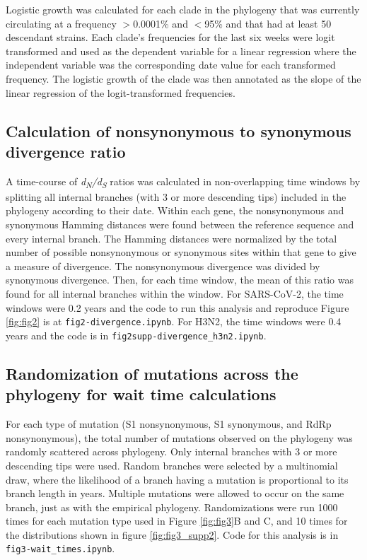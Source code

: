 \documentclass[11pt,oneside,letterpaper]{article}
\begin{document}
Logistic growth was calculated for each clade in the phylogeny that was currently circulating at a frequency $>$0.0001\% and $<$95\% and that had at least 50 descendant strains. Each clade’s frequencies for the last six weeks were logit transformed and used as the dependent variable for a linear regression where the independent variable was the corresponding date value for each transformed frequency. The logistic growth of the clade was then annotated as the slope of the linear regression of the logit-transformed frequencies.

\subsection*{Calculation of nonsynonymous to synonymous divergence ratio}
A time-course of \emph{d\textsubscript{N}/d\textsubscript{S}} ratios was calculated in non-overlapping time windows by splitting all internal branches (with 3 or more descending tips) included in the phylogeny according to their date. Within each gene, the nonsynonymous and synonymous Hamming distances were found between the reference sequence and every internal branch. The Hamming distances were normalized by the total number of possible nonsynonymous or synonymous sites within that gene to give a measure of divergence. The nonsynonymous divergence was divided by synonymous divergence. Then, for each time window, the mean of this ratio was found for all internal branches within the window. For SARS-CoV-2, the time windows were 0.2 years and the code to run this analysis and reproduce Figure \ref{fig:fig2} is at \texttt{fig2-divergence.ipynb}. For H3N2, the time windows were 0.4 years and the code is in \texttt{fig2supp-divergence\_h3n2.ipynb}.

\subsection*{Randomization of mutations across the phylogeny for wait time calculations}
For each type of mutation (S1 nonsynonymous, S1 synonymous, and RdRp nonsynonymous), the total number of mutations observed on the phylogeny was randomly scattered across phylogeny. Only internal branches with 3 or more descending tips were used. Random branches were selected by a multinomial draw, where the likelihood of a branch having a mutation is proportional to its branch length in years. Multiple mutations were allowed to occur on the same branch, just as with the empirical phylogeny. Randomizations were run 1000 times for each mutation type used in Figure \ref{fig:fig3}B and C, and 10 times for the distributions shown in figure \ref{fig:fig3_supp2}. Code for this analysis is in \texttt{fig3-wait\_times.ipynb}.
\end{document}
